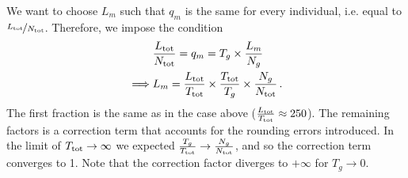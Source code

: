 \documentclass[%
 draft,
 aapm,
 mph,%
 amsmath,amssymb,
 reprint,%
]{revtex4-2}
\begin{document}
We want to choose $L_m$ such that $q_m$ is the same for every individual, i.e. equal to $\nicefrac{L_{\mathrm{tot}}}{N_{\mathrm{tot}}}$. Therefore, we impose the condition
\begin{align}
    &\frac{L_{\mathrm{tot}}}{N_{\mathrm{tot}}} = q_m = T_g \times \frac{L_m}{N_g} \\
    \implies &L_m = \frac{L_{\mathrm{tot}}}{T_{\mathrm{tot}}} \times \frac{T_{\mathrm{tot}}}{T_g} \times \frac{N_g}{N_{\mathrm{tot}}} \,.
\end{align}
The first fraction is the same as in the case above ($\frac{L_{\mathrm{tot}}}{T_{\mathrm{tot}}} \approx 250$). The remaining factors is a correction term that accounts for the rounding errors introduced. In the limit of $T_{\mathrm{tot}} \rightarrow \infty$ we expected $\frac{T_g}{T_{\mathrm{tot}}} \rightarrow \frac{N_g}{N_{\mathrm{tot}}}$, and so the correction term converges to 1. Note that the correction factor diverges to $+\infty$ for $T_g \rightarrow 0$.
\end{document}
